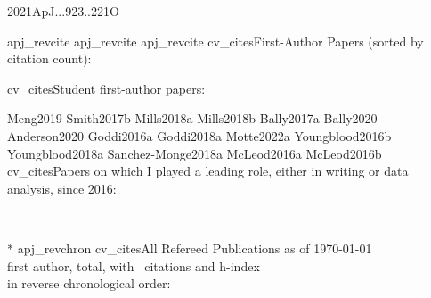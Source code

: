 \documentclass{article}
\begin{document}
\nocite{bibb}{2021ApJ...923..221O}

{apj_revcite}
{apj_revcite}
{apj_revcite}
%
%
{cv_cites}{First-Author Papers (sorted by citation count):}
%


{cv_cites}{Student first-author papers:}

\nocite{bibd}{Meng2019}
\nocite{bibd}{Smith2017b}
\nocite{bibd}{Mills2018a}
\nocite{bibd}{Mills2018b}
\nocite{bibd}{Bally2017a}
\nocite{bibd}{Bally2020}
\nocite{bibd}{Anderson2020}
\nocite{bibd}{Goddi2016a}
\nocite{bibd}{Goddi2018a}
\nocite{bibd}{Motte2022a}
\nocite{bibd}{Youngblood2016b}
\nocite{bibd}{Youngblood2018a}
\nocite{bibd}{Sanchez-Monge2018a}
\nocite{bibd}{McLeod2016a}
\nocite{bibd}{McLeod2016b}
{cv_cites}{Papers on which I played a leading role, either in writing or data analysis, since 2016:}



\vfill  
\nopagebreak

\newpage

\nocite{bibc}{*}
{apj_revchron}
{cv_cites}{All Refereed Publications as of \today\\
\nfirst first author, \nrefereed total, with \ncitestotal\ citations and h-index \hindex\\
in reverse chronological order:}
%




\end{document}

